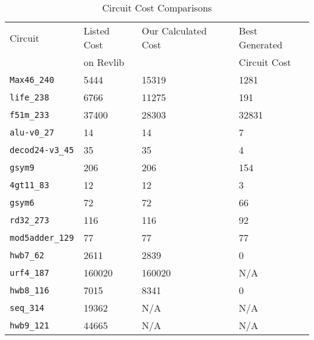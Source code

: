 \begin{table}
\begin{center}
    \begin{tabular}{l | l | l | l}
       Circuit            & Listed Cost & Our Calculated Cost & Best Generated  \\ 
                          & on Revlib   &                     & Circuit Cost    \\ \hline
     \verb!Max46_240!     & 5444                  & 15319               & 1281                        \\
     \verb!life_238!      & 6766                  & 11275               & 191                         \\
     \verb!f51m_233!      & 37400                 & 28303               & 32831                       \\
     \verb!alu-v0_27!     & 14                    & 14                  & 7                           \\
     \verb!decod24-v3_45! & 35                    & 35                  & 4                           \\
     \verb!gsym9!         & 206                   & 206                 & 154                         \\
     \verb!4gt11_83!      & 12                    & 12                  & 3                           \\
     \verb!gsym6!         & 72                    & 72                  & 66                          \\
     \verb!rd32_273!      & 116                   & 116                 & 92                          \\
     \verb!mod5adder_129! & 77                    & 77                  & 77                          \\
     \verb!hwb7_62!       & 2611                  & 2839                & 0                           \\
     \verb!urf4_187!      & 160020                & 160020              & N/A                          \\
     \verb!hwb8_116!      & 7015                  & 8341                & 0                           \\
     \verb!seq_314!       & 19362                 & N/A                  & N/A                          \\
     \verb!hwb9_121!      & 44665                 & N/A                  & N/A                          \\
    \end{tabular}
 \caption {Circuit Cost Comparisons}
\label{Tab:CCC}
\end{center}
\end{table}
